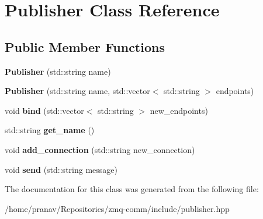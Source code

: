 \hypertarget{classPublisher}{}\section{Publisher Class Reference}
\label{classPublisher}
\subsection*{Public Member Functions}
\begin{DoxyCompactItemize}
\item 
{\bfseries Publisher} (std\+::string name)\hypertarget{classPublisher_a50a9290519fbd4f11aec0577dd4d660a}{}\label{classPublisher_a50a9290519fbd4f11aec0577dd4d660a}

\item 
{\bfseries Publisher} (std\+::string name, std\+::vector$<$ std\+::string $>$ endpoints)\hypertarget{classPublisher_ac65d758b8bf78e6b8e03dd2842862362}{}\label{classPublisher_ac65d758b8bf78e6b8e03dd2842862362}

\item 
void {\bfseries bind} (std\+::vector$<$ std\+::string $>$ new\+\_\+endpoints)\hypertarget{classPublisher_ae87340722160ca793e63efafef895869}{}\label{classPublisher_ae87340722160ca793e63efafef895869}

\item 
std\+::string {\bfseries get\+\_\+name} ()\hypertarget{classPublisher_a0987adfed11685e41bb899e10551efa3}{}\label{classPublisher_a0987adfed11685e41bb899e10551efa3}

\item 
void {\bfseries add\+\_\+connection} (std\+::string new\+\_\+connection)\hypertarget{classPublisher_a18ec9ed7e62a781adfaeaaf30e585f83}{}\label{classPublisher_a18ec9ed7e62a781adfaeaaf30e585f83}

\item 
void {\bfseries send} (std\+::string message)\hypertarget{classPublisher_a23c145dcf3aa27de262c2c5a2e947b26}{}\label{classPublisher_a23c145dcf3aa27de262c2c5a2e947b26}

\end{DoxyCompactItemize}


The documentation for this class was generated from the following file\+:\begin{DoxyCompactItemize}
\item 
/home/pranav/\+Repositories/zmq-\/comm/include/publisher.\+hpp\end{DoxyCompactItemize}
